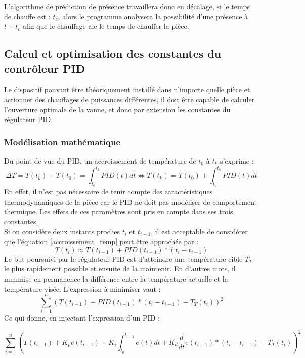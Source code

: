 \documentclass[11pt,a4paper,11pt]{report}
\begin{document}
L'algorithme de prédiction de présence travaillera donc en décalage, si le temps de chauffe est : $t_c$, alors le programme analysera la possibilité d'une présence à $t + t_c$ afin que le chauffage aie le temps de chauffer la pièce.\\

\subsection{Calcul et optimisation des constantes du contrôleur PID}
\label{opti_pid}

Le dispositif pouvant être théoriquement installé dans n'importe quelle pièce et actionner des chauffages de puissances différentes, il doit être capable de calculer l'ouverture optimale de la vanne, et donc par extension les constantes du régulateur PID. 
\subsubsection{Modélisation mathématique}
Du point de vue du PID, un accroissement de température de $t_{0}$ à $t_{k}$ s'exprime :
\begin{equation}
\label{accroissement_temp}
\Delta T = T(t_{k}) - T(t_{0}) = \int_{t_0}^{t_k} PID(t) dt \Leftrightarrow T(t_{k}) = T(t_{0}) + \int_{t_0}^{t_k} PID(t) dt
\end{equation}
En effet, il n'est pas nécessaire de tenir compte des caractéristiques thermodynamiques de la pièce car le PID ne doit pas modéliser de comportement thermique. Les effets de ces paramètres sont pris en compte dans ses trois constantes. \\
Si on considère deux instants proches $t_i$ et $t_{i-1}$, il est acceptable de considérer que l'équation \ref{accroissement_temp} peut être approchée par :
\begin{equation}
T(t_i) \approx T(t_{i-1})+PID(t_{i-1}) * (t_i - t_{i-1})
\end{equation}
Le but poursuivi par le régulateur PID est d'atteindre une température cible $T_T$ le plus rapidement possible et ensuite de la maintenir. En d'autres mots, il minimise en permanence la différence entre la température actuelle et la température visée. L'expression à minimiser vaut :
\begin{equation}
\sum_{i=1}^{n} (T(t_{i-1})+PID(t_{i-1}) * (t_i - t_{i-1}) - T_{T}(t_i))^2
\end{equation}
Ce qui donne, en injectant l'expression d'un PID :

\begin{equation}
\sum_{i=1}^{n} (T(t_{i-1})+ K_p e(t_{i-1}) + K_i \int_{t_{0}}^{t_{i-1}} e(t)dt + K_d\frac{d}{dt}e(t_{i-1})* (t_i - t_{i-1}) - T_{T}(t_i))^2
\end{equation}
\end{document}
